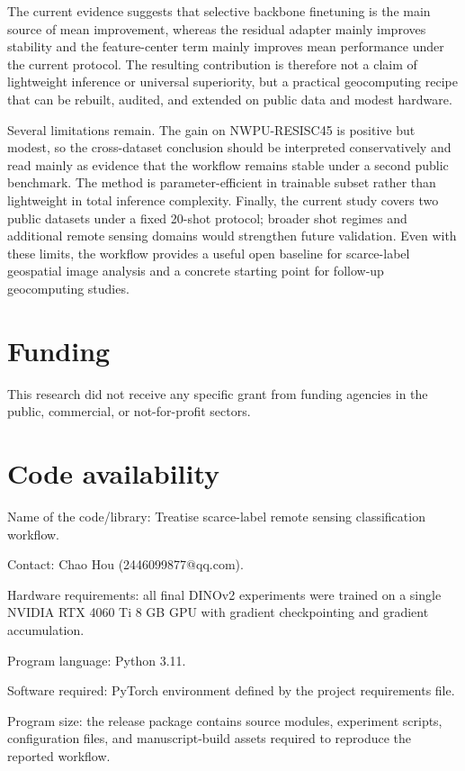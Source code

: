 \documentclass[a4paper,fleqn]{cas-sc}
\begin{document}
The current evidence suggests that selective backbone finetuning is the main source of mean improvement, whereas the residual adapter mainly improves stability and the feature-center term mainly improves mean performance under the current protocol. The resulting contribution is therefore not a claim of lightweight inference or universal superiority, but a practical geocomputing recipe that can be rebuilt, audited, and extended on public data and modest hardware.

Several limitations remain. The gain on NWPU-RESISC45 is positive but modest, so the cross-dataset conclusion should be interpreted conservatively and read mainly as evidence that the workflow remains stable under a second public benchmark. The method is parameter-efficient in trainable subset rather than lightweight in total inference complexity. Finally, the current study covers two public datasets under a fixed 20-shot protocol; broader shot regimes and additional remote sensing domains would strengthen future validation. Even with these limits, the workflow provides a useful open baseline for scarce-label geospatial image analysis and a concrete starting point for follow-up geocomputing studies.

\section*{Funding}
This research did not receive any specific grant from funding agencies in the public, commercial, or not-for-profit sectors.

\section*{Code availability}
Name of the code/library: Treatise scarce-label remote sensing classification workflow.

Contact: Chao Hou (2446099877@qq.com).

Hardware requirements: all final DINOv2 experiments were trained on a single NVIDIA RTX 4060 Ti 8 GB GPU with gradient checkpointing and gradient accumulation.

Program language: Python 3.11.

Software required: PyTorch environment defined by the project requirements file.

Program size: the release package contains source modules, experiment scripts, configuration files, and manuscript-build assets required to reproduce the reported workflow.
\end{document}
